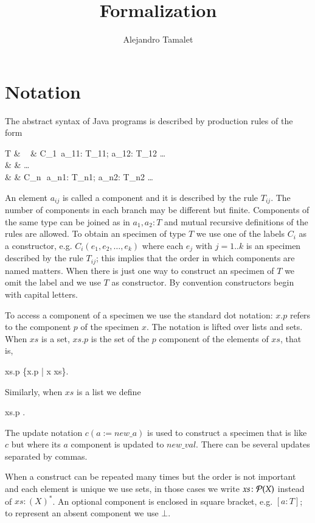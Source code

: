 \documentclass[a4paper,10pt]{article}
\title{Formalization}
\author{Alejandro Tamalet}
\begin{document}
\maketitle

\section{Notation}\label{sec:Notation}
The abstract syntax of Java programs is described by production rules of the form
\begin{haskell}
T & \geqdef\,\,\, & C_1\, a_{11}: T_{11}; a_{12}: T_{12} \dots\\
 & \gbar & \ldots\\
 & \gbar & C_n\,\, a_{n1}: T_{n1}; a_{n2}: T_{n2} \dots\\
\end{haskell}
An element $a_{ij}$ is called a component and it is described by the rule $T_{ij}$. The number of components
in each branch may be different but finite. 
Components of the same type can be joined as in $a_1, a_2 \colon T$ and mutual recursive definitions of the
rules are allowed.
To obtain an specimen of type $T$ we use one of the labels $C_i$ as a constructor, e.g. $C_i(e_1, e_2, \ldots,
e_k)$ where each $e_j$ with $j=1..k$ is an specimen described by the rule $T_{ij}$; this implies that the
order in which components are named matters.
When there is just one way to construct an specimen of $T$ we omit the label and we use $T$ as constructor.
By convention constructors begin with capital letters.

To access a component of a specimen we use the standard dot notation: $x.p$ refers to the component $p$ of the
specimen $x$.
The notation is lifted over lists and sets.
When $xs$ is a set, $xs.p$ is the set of the $p$ component of the elements of $xs$, that is,
\begin{haskell}
  xs.p \eqdef \{x.p | x \in xs\}.
\end{haskell}
Similarly, when $xs$ is a list we define
\begin{haskell}
  xs.p \eqdef [x.p | x \leftarrow xs].
\end{haskell}

The update notation $c(a := new\_a)$ is used to construct a specimen that is like $c$ but where its $a$
component is updated to $new\_val$. There can be several updates separated by commas.

When a construct can be repeated many times but the order is not important and each element is unique we use
sets, in those cases we write $xs \colon {\mathcal{P}}(X)$ instead of $xs \colon (X)^*$.
An optional component is enclosed in square bracket, e.g. $[a \colon T]$; to represent an absent component we
use $\bot$.
\end{document}
